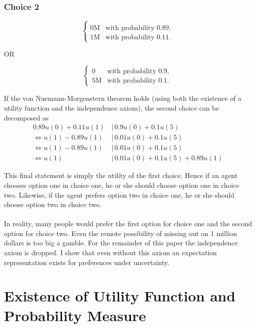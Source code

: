 \documentclass{article}
\begin{document}
\subsubsection{Choice 2}

\begin{equation*}
\left\{
\begin{array}{rl}
\\0\text{M} & \text{with probability } 0.89,
\\1\text{M} & \text{with probability } 0.11.
\end{array} \right.
\end{equation*}

OR

\begin{equation*}
\left\{
\begin{array}{rl}
0 & \text{with probability } 0.9,
\\5\text{M} & \text{with probability } 0.1.
\end{array} \right.
\end{equation*}

If the von Nuemann-Morgenstern theorem holds (using both the existence of a utility function and the independence axiom), the second choice can be decomposed as
\begin{align*}
0.89u(0)+0.11u(1)\, &|\, 0.9u(0)+0.1u(5) \\
\Leftrightarrow u(1)-0.89u(1) \, &|\, 0.01u(0)+0.1u(5) \\
\Leftrightarrow u(1)-0.89u(1) \, &|\, 0.01u(0)+0.1u(5) \\
\Leftrightarrow u(1) \, &|\, 0.01u(0)+0.1u(5)+0.89u(1)
\end{align*}

This final statement is simply the utility of the first choice.  Hence if an agent chooses option one in choice one, he or she should choose option one in choice two.  Likewise, if the agent prefers option two in choice one, he or she should choose option two in choice two.
\\
\\
In reality, many people would prefer the first option for choice one and the second option for choice two.  Even the remote possibility of missing out on 1 million dollars is too big a gamble. For the remainder of this paper the independence axiom is dropped.  I show that even without this axiom an expectation representation exists for preferences under uncertainty.


\section{Existence of Utility Function and Probability Measure}
\end{document}
